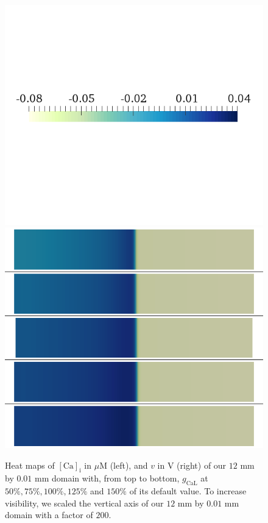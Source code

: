 \documentclass{article}
\begin{document}
\begin{figure}
\begin{minipage}{0.5\textwidth}
\includegraphics[trim=0cm 7cm 0cm 6cm, clip=true, width=1\linewidth]{legend_v2}
\includegraphics[trim=0cm 0cm 0cm 0cm, clip=true, width=1\linewidth]{v_gcal}
    \end{minipage}
    \caption{Heat maps of $[\mathrm{Ca}]_{\mathrm{i}}$ in $\mu$M (left), and $v$ in V (right) of our $12$ mm by $0.01$ mm domain with, from top to bottom, $g_{\mathrm{CaL}}$ at $50\%, 75\%, 100\%, 125\%$ and $150\%$ of its default value. To increase visibility, we scaled the vertical axis of our $12$ mm by $0.01$ mm domain with a factor of $200$.}
    \label{fig:1b}
\end{figure}
\end{document}
